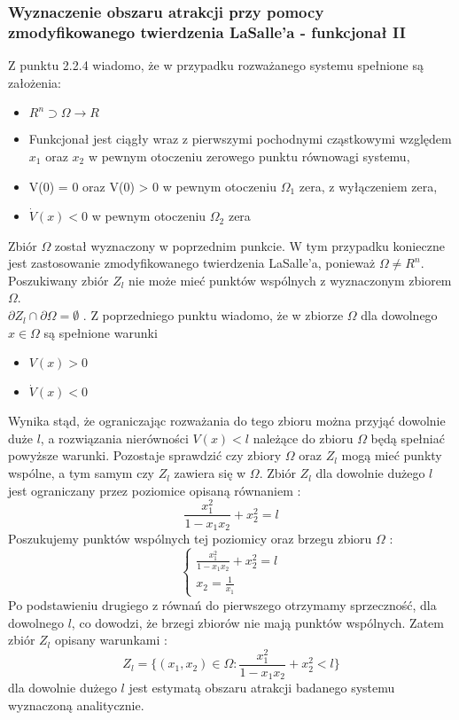 \documentclass[a4paper,11pt]{article}
\begin{document}
\subsubsection{Wyznaczenie obszaru atrakcji przy pomocy zmodyfikowanego twierdzenia LaSalle'a - funkcjonał II}
Z punktu 2.2.4 wiadomo, że w przypadku rozważanego systemu spełnione są założenia: 
\begin{itemize}
\item \( R^{n} \supset \Omega \rightarrow R \)
\item Funkcjonał jest ciągły wraz z pierwszymi pochodnymi cząstkowymi względem \(x_{1}\) oraz \(x_{2}\) w pewnym otoczeniu zerowego punktu równowagi systemu, 
\item V(0) = 0 oraz V(0) > 0 w pewnym otoczeniu \(\Omega_{1}\) zera, z wyłączeniem zera, 
\item \( \dot{V}(x)< 0 \) w pewnym otoczeniu \( \Omega_{2}\) zera
\end{itemize}
Zbiór \( \Omega \) został wyznaczony w poprzednim punkcie. W tym przypadku konieczne jest zastosowanie zmodyfikowanego twierdzenia LaSalle'a, ponieważ \( \Omega \neq R^{n} \). Poszukiwany zbiór \( Z_{l} \) nie może mieć punktów wspólnych z wyznaczonym zbiorem \( \Omega \). \\
\( \partial Z_{l} \cap \partial \Omega = \emptyset \) . 
Z poprzedniego punktu wiadomo, że w zbiorze \( \Omega \) dla dowolnego \( x \in \Omega \) są spełnione warunki 
\begin{itemize}
\item \( V(x)>0 \)
\item \( \dot{V}(x) < 0 \)
\end{itemize}
Wynika stąd, że ograniczając rozważania do tego zbioru można przyjąć dowolnie duże \( l \), a rozwiązania nierówności \( V(x) < l \) należące do zbioru \( \Omega \) będą spełniać powyższe warunki. 
Pozostaje sprawdzić czy zbiory \( \Omega \) oraz \( Z_{l} \) mogą mieć punkty wspólne, a tym samym czy \( Z_{l} \) zawiera się w \( \Omega \).
Zbiór \( Z_{l} \) dla dowolnie dużego \( l \) jest ograniczany przez poziomice opisaną równaniem :
\begin{equation*}
\frac{x_{1}^{2}}{1-x_{1}x_{2}}+x_{2}^{2}=l
\end{equation*}
Poszukujemy punktów wspólnych tej poziomicy oraz brzegu zbioru \( \Omega \) : 
\begin{equation*}
\begin{cases}
\frac{x_{1}^{2}}{1-x_{1}x_{2}}+x_{2}^{2}=l \\
x_{2}=\frac{1}{x_{1}}
\end{cases}
\end{equation*}
Po podstawieniu drugiego z równań do pierwszego otrzymamy sprzeczność, dla dowolnego \( l \), co dowodzi, że brzegi zbiorów nie mają punktów wspólnych.
Zatem zbiór \( Z_{l} \) opisany warunkami : 
\begin{equation*}
Z_{l}= \{ (x_{1},x_{2}) \in \Omega : \frac{x_{1}^{2}}{1-x_{1}x_{2}}+x_{2}^{2}<l \}
\end{equation*}
dla dowolnie dużego \(l\) jest estymatą obszaru atrakcji badanego systemu wyznaczoną analitycznie. 
\end{document}
